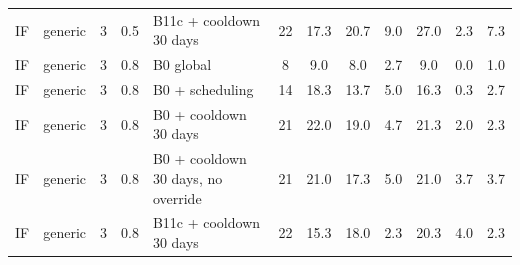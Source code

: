 \begin{longtable}{lllllccccccc}
IF & generic & 3 & 0.5 & B11c + cooldown 30 days & 22 & 17.3 & 20.7 & 9.0 & 27.0 & 2.3 & 7.3 \\
IF & generic & 3 & 0.8 & B0 global & 8 & 9.0 & 8.0 & 2.7 & 9.0 & 0.0 & 1.0 \\
IF & generic & 3 & 0.8 & B0 + scheduling & 14 & 18.3 & 13.7 & 5.0 & 16.3 & 0.3 & 2.7 \\
IF & generic & 3 & 0.8 & B0 + cooldown 30 days & 21 & 22.0 & 19.0 & 4.7 & 21.3 & 2.0 & 2.3 \\
IF & generic & 3 & 0.8 & B0 + cooldown 30 days, no override & 21 & 21.0 & 17.3 & 5.0 & 21.0 & 3.7 & 3.7 \\
IF & generic & 3 & 0.8 & B11c + cooldown 30 days & 22 & 15.3 & 18.0 & 2.3 & 20.3 & 4.0 & 2.3 \\
\bottomrule
\end{longtable}

